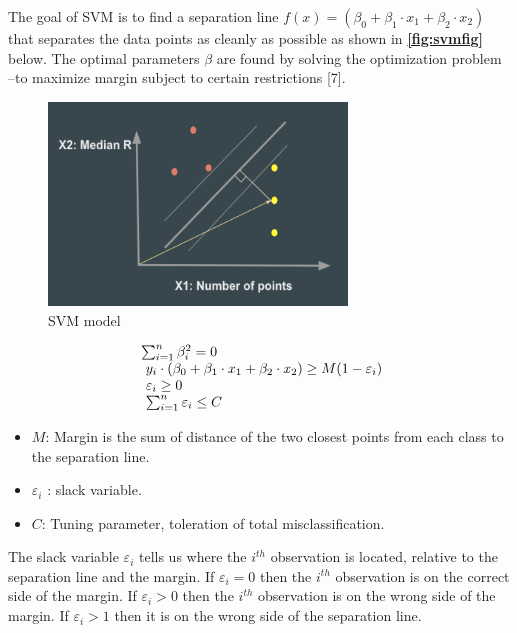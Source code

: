 \documentclass[10pt,letterpaper]{article}
\providecommand{\tightlist}{%
  \setlength{\itemsep}{0pt}\setlength{\parskip}{0pt}}
\begin{document}
The goal of SVM is to find a separation line
\(f(x) = (\beta_0 + \beta_1 \cdot x_1 + \beta_2 \cdot x_2)\) that
separates the data points as cleanly as possible as shown in
\textbf{\autoref{fig:svmfig}} below. The optimal parameters \(\beta\)
are found by solving the optimization problem --to maximize margin
subject to certain restrictions {[}7{]}.

\begin{figure}[h]
\includegraphics[width=3.12in]{figures/svm_fig} \caption{\label{fig:svmfig} SVM model}\label{fig:unnamed-chunk-3}
\end{figure}

\begin{equation}
  \left.
  \begin{array}{l@{\,}l}
     \sum_{i=1}^n \beta_i^2 = 0 \\
     \ y_i \cdot ( \beta_0 + \beta_1 \cdot x_1 + \beta_2 \cdot x_2 ) \geq M(1-\varepsilon_i) \\
     \ \varepsilon_i \geq 0 \\
     \ \sum_{i=1}^n \varepsilon_i \leq C \\
  \end{array}
  \right.
\end{equation}

\begin{itemize}
\tightlist
\item
  \(M\): Margin is the sum of distance of the two closest points from
  each class to the separation line.
\item
  \(\varepsilon_i\) : slack variable.
\item
  \(C\): Tuning parameter, toleration of total misclassification.
\end{itemize}

The slack variable \(\varepsilon_i\) tells us where the \(i^{th}\)
observation is located, relative to the separation line and the margin.
If \(\varepsilon_i = 0\) then the \(i^{th}\) observation is on the
correct side of the margin. If \(\varepsilon_i > 0\) then the \(i^{th}\)
observation is on the wrong side of the margin. If \(\varepsilon_i > 1\)
then it is on the wrong side of the separation line.
\end{document}
